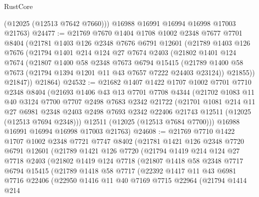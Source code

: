 \begin{lexlean}{RustCore}
\begin{coremodule}
        (@12025 (@12513 @7642 @7660)))
      @16988
      @16991
      @16994
      @16998
      @17003
      @21763)
@24477 := @21769
    @7670
    @1404
    @1708
    @1002
    @2348
    @7677
    @7701
    @8404
    (@21781
      @1403
      @126
      @2348
      @7676
      @6791
      @12601
      (@21789
        @1403
        @126
        @7676
        (@21794
          @1401
          @214
          @124
          @27
          @7674
          @2403
          (@21802
            @1401
            @124
            @7674
            (@21807
              @1400
              @58
              @2348
              @7673
              @6794
              @15415
              (@21789 @1400 @58 @7673 (@21794 @1394 @1201 @11 @43 @7657 @7222 @24403 @23124))
              @21855))
          @21847))
      @21864)
@24532 := @21682
    @1407
    @1422
    @1707
    @1002
    @7701
    @7710
    @2348
    @8404
    (@21693
      @1406
      @43
      @13
      @7701
      @7708
      @4344
      (@21702
        @1083
        @11
        @40
        @3124
        @7700
        @7707
        @2498
        @7683
        @2342
        @21722
        (@21701
          @1081
          @214
          @11
          @27
          @6981
          @2348
          @2403
          @2498
          @7693
          @2342
          @22406
          @21743
          @12511
          (@12025 (@12513 @7694 @2348)))
        @12511
        (@12025 (@12513 @7684 @7700)))
      @16988
      @16991
      @16994
      @16998
      @17003
      @21763)
@24608 := @21769
    @7710
    @1422
    @1707
    @1002
    @2348
    @7721
    @7747
    @8402
    (@21781
      @1421
      @126
      @2348
      @7720
      @6791
      @12601
      (@21789
        @1421
        @126
        @7720
        (@21794
          @1419
          @214
          @124
          @27
          @7718
          @2403
          (@21802
            @1419
            @124
            @7718
            (@21807
              @1418
              @58
              @2348
              @7717
              @6794
              @15415
              (@21789
                @1418
                @58
                @7717
                (@22392
                  @1417
                  @11
                  @43
                  @6981
                  @7716
                  @22406
                  (@22950
                    @1416
                    @11
                    @40
                    @7169
                    @7715
                    @22964
                    (@21794
                      @1414
                      @214

\end{coremodule}
\end{lexlean}
